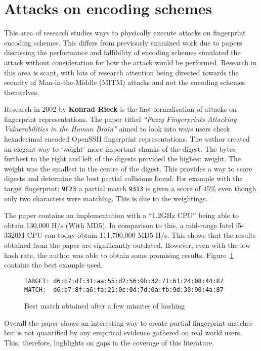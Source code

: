 \section{Attacks on encoding schemes}
This area of research studies ways to physically execute attacks on fingerprint encoding schemes. This differs from previously examined work due to papers discussing the performance and fallibility of encoding schemes simulated the attack without consideration for how the attack would be performed. Research in this area is scant, with lots of research attention being directed towards the security of Man-in-the-Middle (MITM) attacks and not the encoding schemes themselves.

Research in 2002 by \textbf{Konrad Rieck}\cite{rieck2002fuzzy} is the first formalisation of attacks on fingerprint representations. The paper titled \textit{``Fuzzy Fingerprints Attacking Vulnerabilities in the Human Brain''}
aimed to look into ways users check hexadecimal encoded OpenSSH fingerprint representations. The author created an elegant way to `weight' more important chunks of the digest. The bytes furthest to the right and left of the digests provided the highest weight. The weight was the smallest in the centre of the digest. This provides a way to score digests and determine the best partial collisions found. For example with the target fingerprint: \verb|9F23| a partial match \verb|9313| is given a score of 45\% even though only two characters were matching. This is due to the weightings.

The paper contains an implementation with a ``1.2GHz CPU'' being able to obtain 130,000 H/s (With MD5). In comparison to this, a mid-range Intel i5-3320M CPU can today obtain 111,700,000 MD5 H/s. This shows that the results obtained from the paper are significantly outdated. However, even with the low hash rate, the author was able to obtain some promising results. Figure~\ref{ref:fuzz} contains the best example used.

\begin{figure}[!h]
    \begin{center}
        \verb|TARGET: d6:b7:df:31:aa:55:d2:56:9b:32:71:61:24:08:44:87|
        \verb|MATCH:  d6:b7:8f:a6:fa:21:0c:0d:7d:0a:fb:9d:30:90:4a:87|
    \end{center}
    \caption{Best match obtained after a few minutes of hashing}
    \label{ref:fuzz}
\end{figure}

Overall the paper shows an interesting way to create partial fingerprint matches but is not quantified by any empirical evidence gathered on real world users. This, therefore, highlights on gaps in the coverage of this literature.

